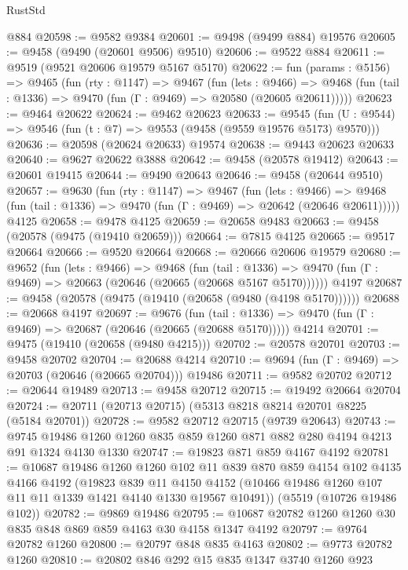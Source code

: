 \begin{lexlean}{RustStd}
\begin{coremodule}
    @884
@20598 := @9582 @9384
@20601 := @9498 (@9499 @884) @19576
@20605 := @9458 (@9490 (@20601 @9506) @9510)
@20606 := @9522 @884
@20611 := @9519 (@9521 @20606 @19579 @5167 @5170)
@20622 := fun (params : @5156) =>
  @9465
    (fun (rty : @1147) =>
    @9467
      (fun (lets : @9466) =>
      @9468 (fun (tail : @1336) => @9470 (fun (Γ : @9469) => @20580 (@20605 @20611)))))
@20623 := @9464 @20622
@20624 := @9462 @20623
@20633 := @9545
    (fun (U : @9544) => @9546 (fun (t : @7) => @9553 (@9458 (@9559 @19576 @5173) @9570)))
@20636 := @20598 (@20624 @20633) @19574
@20638 := @9443 @20623 @20633
@20640 := @9627 @20622 @3888
@20642 := @9458 (@20578 @19412)
@20643 := @20601 @19415
@20644 := @9490 @20643
@20646 := @9458 (@20644 @9510)
@20657 := @9630
    (fun (rty : @1147) =>
    @9467
      (fun (lets : @9466) =>
      @9468 (fun (tail : @1336) => @9470 (fun (Γ : @9469) => @20642 (@20646 @20611)))))
    @4125
@20658 := @9478 @4125
@20659 := @20658 @9483
@20663 := @9458 (@20578 (@9475 (@19410 @20659)))
@20664 := @7815 @4125
@20665 := @9517 @20664
@20666 := @9520 @20664
@20668 := @20666 @20606 @19579
@20680 := @9652
    (fun (lets : @9466) =>
    @9468
      (fun (tail : @1336) =>
      @9470 (fun (Γ : @9469) => @20663 (@20646 (@20665 (@20668 @5167 @5170))))))
    @4197
@20687 := @9458 (@20578 (@9475 (@19410 (@20658 (@9480 (@4198 @5170))))))
@20688 := @20668 @4197
@20697 := @9676
    (fun (tail : @1336) => @9470 (fun (Γ : @9469) => @20687 (@20646 (@20665 (@20688 @5170)))))
    @4214
@20701 := @9475 (@19410 (@20658 (@9480 @4215)))
@20702 := @20578 @20701
@20703 := @9458 @20702
@20704 := @20688 @4214
@20710 := @9694 (fun (Γ : @9469) => @20703 (@20646 (@20665 @20704))) @19486
@20711 := @9582 @20702
@20712 := @20644 @19489
@20713 := @9458 @20712
@20715 := @19492 @20664 @20704
@20724 := @20711 (@20713 @20715) (@5313 @8218 @8214 @20701 @8225 (@5184 @20701))
@20728 := @9582 @20712 @20715 (@9739 @20643)
@20743 := @9745 @19486 @1260 @1260 @835 @859 @1260 @871 @882 @280 @4194 @4213 @91 @1324 @4130 @1330
@20747 := @19823 @871 @859 @4167 @4192
@20781 := @10687
    @19486
    @1260
    @1260
    @102
    @11
    @839
    @870
    @859
    @4154
    @102
    @4135
    @4166
    @4192
    (@19823
      @839
      @11
      @4150
      @4152
      (@10466 @19486 @1260 @107 @11 @11 @1339 @1421 @4140 @1330 @19567 @10491))
    (@5519 (@10726 @19486 @102))
@20782 := @9869 @19486
@20795 := @10687 @20782 @1260 @1260 @30 @835 @848 @869 @859 @4163 @30 @4158 @1347 @4192
@20797 := @9764 @20782 @1260
@20800 := @20797 @848 @835 @4163
@20802 := @9773 @20782 @1260
@20810 := @20802 @846 @292 @15 @835 @1347 @3740 @1260 @923

\end{coremodule}
\end{lexlean}
